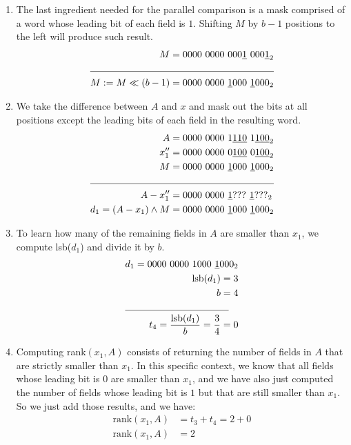 \begin{itemize}
\begin{enumerate}
        \item
        The last ingredient needed for the parallel comparison is a mask comprised of a word whose leading bit of each field is $1$. Shifting $M$ by $b - 1$ positions to the left will produce such result.
        \begin{align*}
            M = 0000\ 0000\ 000\underline{1}\ 000\underline{1}_2& \\
            \cline{1-2}
            M := M \ll (b - 1) = 0000\ 0000\ \underline{1}000\ \underline{1}000_2& \\
        \end{align*}
        
        \item
        We take the difference between $A$ and $x$ and mask out the bits at all positions except the leading bits of each field in the resulting word.
        \begin{align*}
            A &= 0000\ 0000\ 1\underline{110}\ 1\underline{100}_2 \\
            x_1'' &= 0000\ 0000\ 0\underline{100}\ 0\underline{100}_2 \\
            M &= 0000\ 0000\ \underline{1}000\ \underline{1}000_2 \\
            \cline{1-2}
            A - x_1'' &= 0000\ 0000\ \underline{1}???\ \underline{1}???_2 \\
            d_1 = (A - x_1) \wedge M &= 0000\ 0000\ \underline{1}000\ \underline{1}000_2 \\
        \end{align*}
        
        \item
        To learn how many of the remaining fields in $A$ are smaller than $x_1$, we compute lsb($d_1$) and divide it by $b$.
        \begin{align*}
            d_1 = 0000\ 0000\ 1000\ \underline{1}000_2 \\
            \text{lsb}(d_1) = 3 \\
            b = 4 \\
            \cline{1-2}
            t_4 = \frac{\text{lsb}(d_1)}{b} = \frac{3}{4} = 0 
        \end{align*}
        
        \item
        Computing rank$(x_1, A)$ consists of returning the number of fields in $A$ that are strictly smaller than $x_1$. In this specific context, we know that all fields whose leading bit is $0$ are smaller than $x_1$, and we have also just computed the number of fields whose leading bit is $1$ but that are still smaller than $x_1$. So we just add those results, and we have:
        \begin{align*}
            \text{rank}(x_1, A) &= t_3 + t_4 = 2 + 0 \\
            \text{rank}(x_1, A) &= 2
        \end{align*}
        

\end{enumerate}
\end{itemize}
